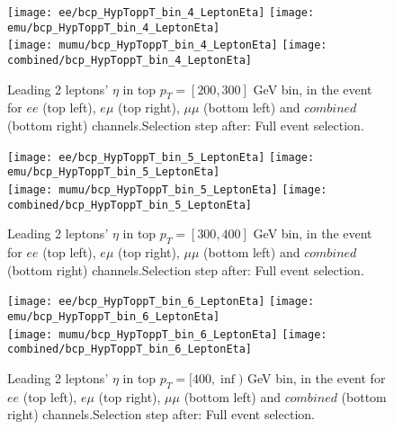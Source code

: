 \begin{figure}
  \texttt{[image: ee/bcp\_HypToppT\_bin\_4\_LeptonEta]}
  \texttt{[image: emu/bcp\_HypToppT\_bin\_4\_LeptonEta]}\\
  \texttt{[image: mumu/bcp\_HypToppT\_bin\_4\_LeptonEta]}
  \texttt{[image: combined/bcp\_HypToppT\_bin\_4\_LeptonEta]}
\caption{Leading 2 leptons' $\eta$ in top $p_T = [200,300]$ GeV bin, in the event for $ee$ (top left), $e\mu$ (top right), $\mu\mu$ (bottom left) and $combined$ (bottom right) channels.\newline Selection step after: Full event selection.}
\end{figure}

\clearpage
\newpage


\begin{figure}
  \texttt{[image: ee/bcp\_HypToppT\_bin\_5\_LeptonEta]}
  \texttt{[image: emu/bcp\_HypToppT\_bin\_5\_LeptonEta]}\\
  \texttt{[image: mumu/bcp\_HypToppT\_bin\_5\_LeptonEta]}
  \texttt{[image: combined/bcp\_HypToppT\_bin\_5\_LeptonEta]}
\caption{Leading 2 leptons' $\eta$ in top $p_T = [300,400]$ GeV bin, in the event for $ee$ (top left), $e\mu$ (top right), $\mu\mu$ (bottom left) and $combined$ (bottom right) channels.\newline Selection step after: Full event selection.}
\end{figure}

\clearpage
\newpage

\begin{figure}
  \texttt{[image: ee/bcp\_HypToppT\_bin\_6\_LeptonEta]}
  \texttt{[image: emu/bcp\_HypToppT\_bin\_6\_LeptonEta]}\\
  \texttt{[image: mumu/bcp\_HypToppT\_bin\_6\_LeptonEta]}
  \texttt{[image: combined/bcp\_HypToppT\_bin\_6\_LeptonEta]}
\caption{Leading 2 leptons' $\eta$ in top $p_T = [400,\inf)$ GeV bin, in the event for $ee$ (top left), $e\mu$ (top right), $\mu\mu$ (bottom left) and $combined$ (bottom right) channels.\newline Selection step after: Full event selection.}
\end{figure}

\clearpage
\newpage